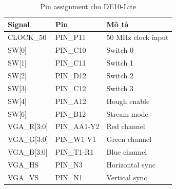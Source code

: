 \documentclass[12pt,a4paper]{report}
\begin{document}
\begin{table}[H]
\centering
\caption{Pin assignment cho DE10-Lite}
\begin{tabular}{|l|l|l|}
\hline
\textbf{Signal} & \textbf{Pin} & \textbf{Mô tả} \\
\hline
CLOCK\_50 & PIN\_P11 & 50 MHz clock input \\
\hline
SW[0] & PIN\_C10 & Switch 0 \\
SW[1] & PIN\_C11 & Switch 1 \\
SW[2] & PIN\_D12 & Switch 2 \\
SW[3] & PIN\_C12 & Switch 3 \\
SW[4] & PIN\_A12 & Hough enable \\
SW[6] & PIN\_B12 & Stream mode \\
\hline
VGA\_R[3:0] & PIN\_AA1-Y2 & Red channel \\
VGA\_G[3:0] & PIN\_W1-V1 & Green channel \\
VGA\_B[3:0] & PIN\_T1-R1 & Blue channel \\
VGA\_HS & PIN\_N3 & Horizontal sync \\
VGA\_VS & PIN\_N1 & Vertical sync \\
\hline
\end{tabular}
\end{table}
\end{document}
